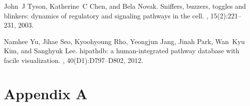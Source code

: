 \documentclass[11pt,a4paper,twoside]{epig}
\begin{document}
\begin{thebibliography}{10}
John~J Tyson, Katherine~C Chen, and Bela Novak.
\newblock Sniffers, buzzers, toggles and blinkers: dynamics of regulatory and
  signaling pathways in the cell.
, 15(2):221--231, 2003.

Namhee Yu, Jihae Seo, Kyoohyoung Rho, Yeongjun Jang, Jinah Park, Wan~Kyu Kim,
  and Sanghyuk Lee.
\newblock hipathdb: a human-integrated pathway database with facile
  visualization.
, 40(D1):D797--D802, 2012.

\end{thebibliography}




\clearpage
\appendix
\section*{Appendix A}
\label{annexe1}
\end{document}
